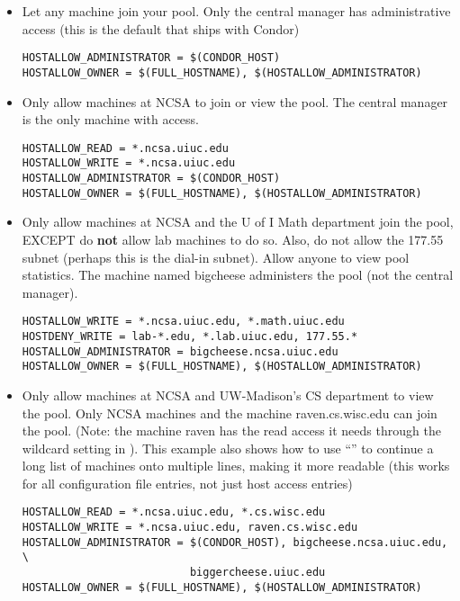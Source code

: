 \begin{itemize}

\item Let any machine join your pool.
Only the central manager has
administrative access (this is the default that ships with Condor)
\footnotesize
\begin{verbatim}
HOSTALLOW_ADMINISTRATOR = $(CONDOR_HOST)
HOSTALLOW_OWNER = $(FULL_HOSTNAME), $(HOSTALLOW_ADMINISTRATOR)
\end{verbatim}
\normalsize

\item Only allow machines at NCSA to join or view the pool.
The central manager is the only machine with  access.
\footnotesize
\begin{verbatim}
HOSTALLOW_READ = *.ncsa.uiuc.edu
HOSTALLOW_WRITE = *.ncsa.uiuc.edu
HOSTALLOW_ADMINISTRATOR = $(CONDOR_HOST)
HOSTALLOW_OWNER = $(FULL_HOSTNAME), $(HOSTALLOW_ADMINISTRATOR)
\end{verbatim}
\normalsize

\item Only allow machines at NCSA and the U of I Math department join the
pool, EXCEPT do \textbf{not} allow lab machines to do so.
Also, do not
allow the 177.55 subnet (perhaps this is the dial-in subnet).
Allow anyone to view pool statistics.  The machine named
bigcheese administers the pool (not the central manager).
\footnotesize
\begin{verbatim}
HOSTALLOW_WRITE = *.ncsa.uiuc.edu, *.math.uiuc.edu
HOSTDENY_WRITE = lab-*.edu, *.lab.uiuc.edu, 177.55.*
HOSTALLOW_ADMINISTRATOR = bigcheese.ncsa.uiuc.edu
HOSTALLOW_OWNER = $(FULL_HOSTNAME), $(HOSTALLOW_ADMINISTRATOR)
\end{verbatim}
\normalsize

\item Only allow machines at NCSA and UW-Madison's CS department to
view the pool.  Only NCSA machines and the machine raven.cs.wisc.edu can join
the pool.
(Note: the machine raven has the read access it needs through the
wildcard setting in ).
This example also shows
how to use ``\verb@\@'' to continue a long list of machines
onto multiple lines, making it more readable (this works for all
configuration file entries, not just host access entries)
\footnotesize
\begin{verbatim}
HOSTALLOW_READ = *.ncsa.uiuc.edu, *.cs.wisc.edu
HOSTALLOW_WRITE = *.ncsa.uiuc.edu, raven.cs.wisc.edu
HOSTALLOW_ADMINISTRATOR = $(CONDOR_HOST), bigcheese.ncsa.uiuc.edu, \
                          biggercheese.uiuc.edu
HOSTALLOW_OWNER = $(FULL_HOSTNAME), $(HOSTALLOW_ADMINISTRATOR)
\end{verbatim}
\normalsize


\end{itemize}
